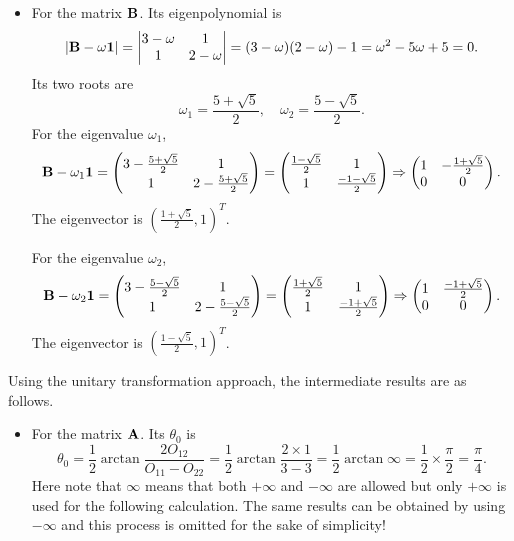 \documentclass[a4paper]{book}
\newcounter{solution}[chapter]
\newcommand{\A}{{\bf A}}
\newcommand{\B}{{\bf B}}
\newcommand{\I}{{\bf 1}}
\begin{document}
\begin{solution}
\begin{itemize}
	\item For the matrix $\B$. Its eigenpolynomial is
	\begin{align*}
		| \B - \omega \I | = \begin{vmatrix}
			3 - \omega & 1 \\ 1 & 2 - \omega 
		\end{vmatrix} = ( 3 - \omega )( 2 - \omega ) - 1 = \omega^2 - 5 \omega + 5 = 0.
	\end{align*}
	Its two roots are
	\[
		\omega_1 = \frac{ 5 + \sqrt{5} }{2} , \quad \omega_2 = \frac{ 5 - \sqrt{5} }{2} .
	\]
	For the eigenvalue $\omega_1$,
	\[
		\B - \omega_1 \I = \begin{pmatrix}
			3 - \frac{ 5 + \sqrt{5} }{2} & 1 \\ 1 & 2 - \frac{ 5 + \sqrt{5} }{2}
		\end{pmatrix} = \begin{pmatrix}
			\frac{ 1 - \sqrt{5} }{2} & 1 \\ 1 & \frac{ - 1 - \sqrt{5} }{2}
		\end{pmatrix} \Rightarrow \begin{pmatrix}
			1 & - \frac{ 1 + \sqrt{5} }{2} \\ 0 & 0
		\end{pmatrix} .
	\]
	The eigenvector is $( \frac{ 1 + \sqrt{5} }{2} , 1 )^T$.
	
	For the eigenvalue $\omega_2$,
	\[
		\B - \omega_2 \I = \begin{pmatrix}
			3 - \frac{ 5 - \sqrt{5} }{2} & 1 \\ 1 & 2 - \frac{ 5 - \sqrt{5} }{2}
		\end{pmatrix} = \begin{pmatrix}
			\frac{ 1 + \sqrt{5} }{2} & 1 \\ 1 & \frac{ -1 + \sqrt{5} }{2}
		\end{pmatrix} \Rightarrow \begin{pmatrix}
			1 & \frac{ -1 + \sqrt{5} }{2} \\ 0 & 0
		\end{pmatrix} .
	\]
	The eigenvector is $( \frac{ 1 - \sqrt{5} }{2} , 1 )^T$.
	
	\end{itemize}
	
	Using the unitary transformation approach, the intermediate results are as follows.
	\begin{itemize}
	
	\item For the matrix $\A$. Its $\theta_0$ is
	\[
		\theta_0 = \frac{1}{2} \arctan{\frac{ 2O_{12} }{ O_{11} - O_{22} } } = \frac{1}{2} \arctan{ \frac{ 2 \times 1 }{ 3 - 3 } } = \frac{1}{2} \arctan{ \infty } = \frac{1}{2} \times \frac{ \pi }{ 2 } = \frac{ \pi }{ 4 } .
	\]
	Here note that $\infty$	means that both $+\infty$ and $-\infty$ are allowed but only $+\infty$ is used for the following calculation. The same results can be obtained by using $-\infty$ and this process is omitted for the sake of simplicity!
	

\end{itemize}
\end{solution}
\end{document}
